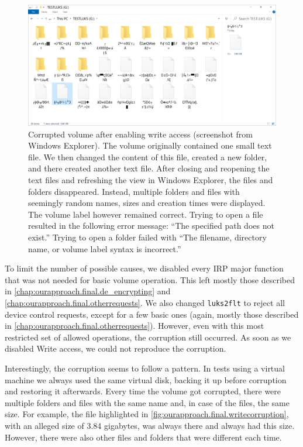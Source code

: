 \begin{figure}[htb!]
	\center
	\includegraphics[scale=0.47]{../img/ourapproach.final.writecorruption.png}
	\caption[
		Corrupted volume after enabling write access
	]{
		Corrupted volume after enabling write access (screenshot from Windows Explorer). The volume originally contained one small text file. We then changed the content of this file, created a new folder, and there created another text file. After closing and reopening the text files and refreshing the view in Windows Explorer, the files and folders disappeared. Instead, multiple folders and files with seemingly random names, sizes and creation times were displayed. The volume label however remained correct. Trying to open a file resulted in the following error message: ``The specified path does not exist.'' Trying to open a folder failed with ``The filename, directory name, or volume label syntax is incorrect.''
	}
	\label{fig:ourapproach.final.writecorruption}
\end{figure}

To limit the number of possible causes, we disabled every IRP major function that was not needed for basic volume operation. This left mostly those described in \autoref{chap:ourapproach.final.de_encrypting} and \autoref{chap:ourapproach.final.otherrequests}. We also changed \texttt{luks2flt} to reject all device control requests, except for a few basic ones (again, mostly those described in \autoref{chap:ourapproach.final.otherrequests}). However, even with this most restricted set of allowed operations, the corruption still occurred. As soon as we disabled Write access, we could not reproduce the corruption.

Interestingly, the corruption seems to follow a pattern. In tests using a virtual machine we always used the same virtual disk, backing it up before corruption and restoring it afterwards. Every time the volume got corrupted, there were multiple folders and files with the same name and, in case of the files, the same size. For example, the file highlighted in \autoref{fig:ourapproach.final.writecorruption}, with an alleged size of 3.84 gigabytes, was always there and always had this size. However, there were also other files and folders that were different each time.


